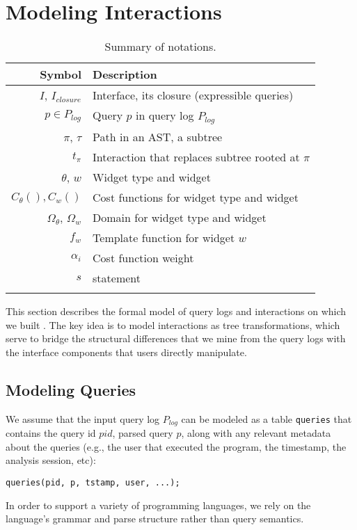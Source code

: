 \section{Modeling Interactions}\label{s:model}

\begin{table}[b]
	\small
	\centering
	\begin{tabular}{rl}
			\toprule
			\textbf{Symbol}  & \textbf{Description}   \\
			\midrule
			$I$, $I_{closure}$  & Interface, its closure (expressible queries) \\
			$p \in P_{log}$  & Query $p$ in  query log $P_{log}$\\
			$\pi$, $\tau$  & Path in an AST, a subtree \\
			$t_\pi$ & Interaction that replaces subtree rooted at $\pi$ \\
			$\theta$, $w$  & Widget type and widget \\
			$C_\theta(), C_w()$  & Cost functions for widget type and widget \\
			$\Omega_\theta$, $\Omega_w$  & Domain for widget type and widget \\
			$f_w$  & Template function for widget $w$\\
			$\alpha_i$  & Cost function weight \\
			$s$ & \lang statement \\
			\bottomrule
			\\
	\end{tabular}
	\label{t:symbols}
	\caption{Summary of notations.}
\end{table}

This section describes the formal model of query logs and interactions on which we built \sys{}. The key idea is to model interactions as tree transformations, which serve to bridge the structural differences that we mine from the query logs with the interface components that users directly manipulate.



\subsection{Modeling Queries}\label{s:model-progs}

We assume that the input query log $P_{log}$ can be modeled as a table \texttt{queries} that contains the query id $pid$, parsed query $p$, along with any relevant metadata about the queries (e.g., the user that executed the program, the timestamp, the analysis session, etc):
{\small\begin{center}
  \texttt{queries(pid, p, tstamp, user, ...);}
  \end{center}
}
In order to support a variety of programming languages, we rely on the language's grammar and parse structure rather than query semantics.

